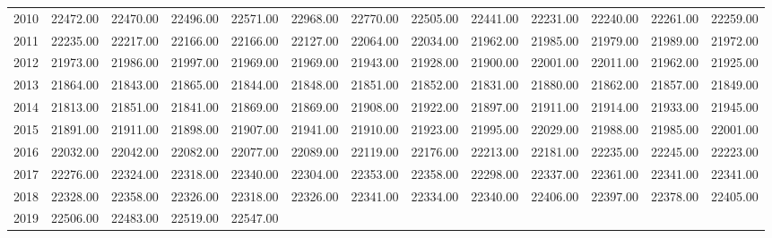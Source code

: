 \begin{longtable}{rrrrrrrrrrrrr}
  2010 & 22472.00 & 22470.00 & 22496.00 & 22571.00 & 22968.00 & 22770.00 & 22505.00 & 22441.00 & 22231.00 & 22240.00 & 22261.00 & 22259.00 \\ 
  2011 & 22235.00 & 22217.00 & 22166.00 & 22166.00 & 22127.00 & 22064.00 & 22034.00 & 21962.00 & 21985.00 & 21979.00 & 21989.00 & 21972.00 \\ 
  2012 & 21973.00 & 21986.00 & 21997.00 & 21969.00 & 21969.00 & 21943.00 & 21928.00 & 21900.00 & 22001.00 & 22011.00 & 21962.00 & 21925.00 \\ 
  2013 & 21864.00 & 21843.00 & 21865.00 & 21844.00 & 21848.00 & 21851.00 & 21852.00 & 21831.00 & 21880.00 & 21862.00 & 21857.00 & 21849.00 \\ 
  2014 & 21813.00 & 21851.00 & 21841.00 & 21869.00 & 21869.00 & 21908.00 & 21922.00 & 21897.00 & 21911.00 & 21914.00 & 21933.00 & 21945.00 \\ 
  2015 & 21891.00 & 21911.00 & 21898.00 & 21907.00 & 21941.00 & 21910.00 & 21923.00 & 21995.00 & 22029.00 & 21988.00 & 21985.00 & 22001.00 \\ 
  2016 & 22032.00 & 22042.00 & 22082.00 & 22077.00 & 22089.00 & 22119.00 & 22176.00 & 22213.00 & 22181.00 & 22235.00 & 22245.00 & 22223.00 \\ 
  2017 & 22276.00 & 22324.00 & 22318.00 & 22340.00 & 22304.00 & 22353.00 & 22358.00 & 22298.00 & 22337.00 & 22361.00 & 22341.00 & 22341.00 \\ 
  2018 & 22328.00 & 22358.00 & 22326.00 & 22318.00 & 22326.00 & 22341.00 & 22334.00 & 22340.00 & 22406.00 & 22397.00 & 22378.00 & 22405.00 \\ 
  2019 & 22506.00 & 22483.00 & 22519.00 & 22547.00 &  &  &  &  &  &  &  &  \\ 
   \hline
\hline
\end{longtable}

